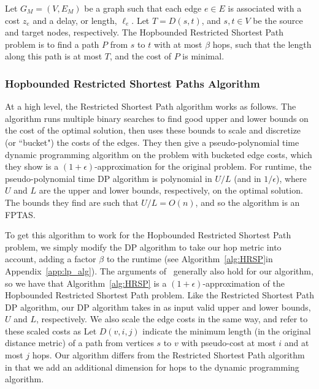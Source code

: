 \begin{definition}
    Let $G_M = (V,E_M)$ be a graph such that each edge $e \in E$ is associated with a cost $z_e$ and a delay, or length, $\ell_e$. Let $T = D(s,t)$, and $s,t \in V$ be the source and target nodes, respectively. The Hopbounded Restricted Shortest Path problem is to find a path $P$ from $s$ to $t$ with at most $\beta$ hops, such that the length along this path is at most $T$, and the cost of $P$ is minimal.
\end{definition}

\subsubsection{Hopbounded Restricted Shortest Paths Algorithm}
At a high level, the Restricted Shortest Path algorithm works as follows. The algorithm runs multiple binary searches to find good upper and lower bounds on the cost of the optimal solution, then uses these bounds to scale and discretize (or ``bucket") the costs of the edges. They then give a pseudo-polynomial time dynamic programming algorithm on the problem with bucketed edge costs, which they show is a $(1+\epsilon)$-approximation for the original problem. For runtime, the pseudo-polynomial time DP algorithm is polynomial in $U/L$ (and in $1/\epsilon$), where $U$ and $L$ are the upper and lower bounds, respectively, on the optimal solution. The bounds they find are such that $U/L = O(n)$, and so the algorithm is an FPTAS. 

To get this algorithm to work for the Hopbounded Restricted Shortest Path problem, we simply modify the DP algorithm to take our hop metric into account, adding a factor $\beta$ to the runtime (see Algorithm~\ref{alg:HRSP}\iflong\else in Appendix~\ref{app:lp_alg}\fi). \iflong \else The arguments of~\cite{LR01} generally also hold for our algorithm, so we have that Algorithm~\ref{alg:HRSP} is a $(1+\epsilon)$-approximation of the Hopbounded Restricted Shortest Path problem. \fi
\iflong
Like the Restricted Shortest Path DP algorithm, our DP algorithm takes in as input valid upper and lower bounds, $U$ and $L$, respectively. We also scale the edge costs in the same way, and refer to these scaled costs as  Let $D(v, i, j)$ indicate the minimum length (in the original distance metric) of a path from vertices $s$ to $v$ with pseudo-cost at most $i$ and at most $j$ hops. Our algorithm differs from the Restricted Shortest Path algorithm in that we add an additional dimension for hops to the dynamic programming algorithm.

